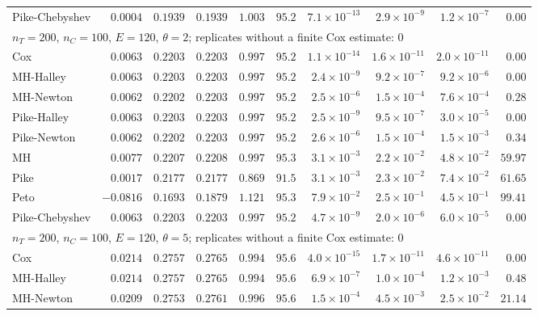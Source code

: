 \begin{landscape}
\begin{longtable}{lrrrrrrrrr}
Pike-Chebyshev & $0.0004$ & $0.1939$ & $0.1939$ & $1.003$ & $95.2$ & $7.1 \times 10^{-13}$ & $2.9 \times 10^{-9}$ & $1.2 \times 10^{-7}$ & $0.00$ \\
\multicolumn{10}{l}{$n_T = 200$, $n_C = 100$, $E = 120$, $\theta = 2$; replicates without a finite Cox estimate: 0} \\
Cox & $0.0063$ & $0.2203$ & $0.2203$ & $0.997$ & $95.2$ & $1.1 \times 10^{-14}$ & $1.6 \times 10^{-11}$ & $2.0 \times 10^{-11}$ & $0.00$ \\
MH-Halley & $0.0063$ & $0.2203$ & $0.2203$ & $0.997$ & $95.2$ & $2.4 \times 10^{-9}$ & $9.2 \times 10^{-7}$ & $9.2 \times 10^{-6}$ & $0.00$ \\
MH-Newton & $0.0062$ & $0.2202$ & $0.2203$ & $0.997$ & $95.2$ & $2.5 \times 10^{-6}$ & $1.5 \times 10^{-4}$ & $7.6 \times 10^{-4}$ & $0.28$ \\
Pike-Halley & $0.0063$ & $0.2203$ & $0.2203$ & $0.997$ & $95.2$ & $2.5 \times 10^{-9}$ & $9.5 \times 10^{-7}$ & $3.0 \times 10^{-5}$ & $0.00$ \\
Pike-Newton & $0.0062$ & $0.2202$ & $0.2203$ & $0.997$ & $95.2$ & $2.6 \times 10^{-6}$ & $1.5 \times 10^{-4}$ & $1.5 \times 10^{-3}$ & $0.34$ \\
MH & $0.0077$ & $0.2207$ & $0.2208$ & $0.997$ & $95.3$ & $3.1 \times 10^{-3}$ & $2.2 \times 10^{-2}$ & $4.8 \times 10^{-2}$ & $59.97$ \\
Pike & $0.0017$ & $0.2177$ & $0.2177$ & $0.869$ & $91.5$ & $3.1 \times 10^{-3}$ & $2.3 \times 10^{-2}$ & $7.4 \times 10^{-2}$ & $61.65$ \\
Peto & $-0.0816$ & $0.1693$ & $0.1879$ & $1.121$ & $95.3$ & $7.9 \times 10^{-2}$ & $2.5 \times 10^{-1}$ & $4.5 \times 10^{-1}$ & $99.41$ \\
Pike-Chebyshev & $0.0063$ & $0.2203$ & $0.2203$ & $0.997$ & $95.2$ & $4.7 \times 10^{-9}$ & $2.0 \times 10^{-6}$ & $6.0 \times 10^{-5}$ & $0.00$ \\
\multicolumn{10}{l}{$n_T = 200$, $n_C = 100$, $E = 120$, $\theta = 5$; replicates without a finite Cox estimate: 0} \\
Cox & $0.0214$ & $0.2757$ & $0.2765$ & $0.994$ & $95.6$ & $4.0 \times 10^{-15}$ & $1.7 \times 10^{-11}$ & $4.6 \times 10^{-11}$ & $0.00$ \\
MH-Halley & $0.0214$ & $0.2757$ & $0.2765$ & $0.994$ & $95.6$ & $6.9 \times 10^{-7}$ & $1.0 \times 10^{-4}$ & $1.2 \times 10^{-3}$ & $0.48$ \\
MH-Newton & $0.0209$ & $0.2753$ & $0.2761$ & $0.996$ & $95.6$ & $1.5 \times 10^{-4}$ & $4.5 \times 10^{-3}$ & $2.5 \times 10^{-2}$ & $21.14$ \\

\end{longtable}
\end{landscape}

